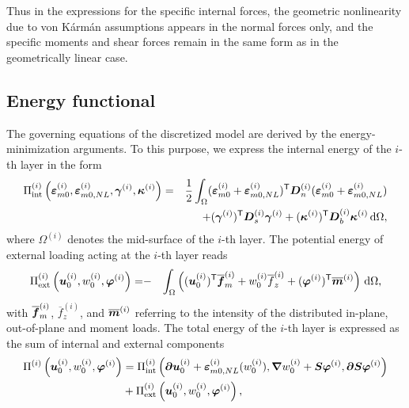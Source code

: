 \documentclass[11pt]{article}
\newcommand{\de}[1]{\,{\mathrm d}#1}
\newcommand{\curv}{\kappa} \newcommand{\curvx}{\kappa_x}
\newcommand{\rot}{\varphi}
\newcommand{\strain}{\varepsilon}
\newcommand{\sstrain}{\gamma}
\newcommand{\m}{_m}
\newcommand{\mO}{_{m0}}
\newcommand{\mONL}{_{m0,NL}}
\newcommand{\Dn}{\mtrx{D}_n}
\newcommand{\Db}{\mtrx{D}_b}
\newcommand{\Ds}{\mtrx{D}_s}
\newcommand{\layer}[1]{^{(#1)}}
\newcommand{\lay}[1]{^{(#1)}}
\newcommand{\Eint}{\Pi_{\mathrm{int}}}
\newcommand{\Eext}{\Pi_{\mathrm{ext}}}
\newcommand{\Etot}{\Pi}
\newcommand{\dmn}{\Omega}
\begin{document}
Thus in the expressions for the specific internal forces, the geometric nonlinearity due to von K\'{a}rm\'{a}n assumptions appears in the normal
forces only, and the specific moments and shear forces remain in the same form as in the geometrically linear case. 

\subsection{Energy functional}\label{sec:energy}
The governing equations of the discretized model are derived by the energy-minimization arguments. To this purpose, we express the internal energy of the $i$-th layer in the form 
\begin{eqnarray}\label{eq5:EintLEP}
\Eint\layer{i}
	\left( 
		\mtrx{\strain}\layer{i}\mO, 
		\mtrx{\strain}\layer{i}\mONL, 
		\mtrx{\sstrain}\layer{i}, 
		\mtrx{\curv}\layer{i} 
	\right)
=&&
\frac{1}{2}
\int_{\dmn}
(\mtrx{\strain}\layer{i}\mO+\mtrx{\strain}\layer{i}\mONL)\trn 
\Dn\layer{i} 
(\mtrx{\strain}\layer{i}\mO+\mtrx{\strain}\layer{i}\mONL)\\ \nonumber
&&+
(\mtrx{\sstrain}\layer{i})\trn \Ds\layer{i} \mtrx{\sstrain}\layer{i} 
+
(\mtrx{\curv}\layer{i})\trn \Db\layer{i} \mtrx{\curv}\layer{i}
\de \dmn,
\end{eqnarray}
where $\Omega\lay{i}$ denotes the mid-surface of the $i$-th layer. The potential energy of external loading acting at the $i$-th layer reads
\begin{eqnarray}
\Eext\layer{i}
\left(
	\mtrx{u}_0\layer{i},
	w_0\layer{i},
	\mtrx{\rot}\layer{i} 
\right)
= 
& - &
\int_{\dmn}
\left(
	(\mtrx{u}_0\layer{i})\trn \overline{\mtrx{f}}\m\layer{i} 
	+
	w_0\layer{i} \overline{f}_z\layer{i} 
	+
	(\mtrx{\rot}\layer{i})\trn \overline{\mtrx{m}}\layer{i} 
\right)
\de \dmn,
\label{eq4:EextLEP}
\end{eqnarray}
with $\overline{\mtrx{f}}\m\layer{i}$, $\overline{f}_z\layer{i}$, and $\overline{\mtrx{m}}\layer{i}$ referring to the intensity of the distributed
in-plane, out-of-plane and moment loads. The total energy of the $i$-th layer is expressed as the sum of internal and external components
\begin{align}
\Etot\layer{i} 
\left(
	\mtrx{u}_0\layer{i},
	w_0\layer{i},
	\mtrx{\rot}\layer{i}
\right)
& =
\Eint\layer{i}
\left(
\pard\mtrx{u}\layer{i}_0 + \mtrx{\strain}\mONL\layer{i}(w_0\layer{i}),
\mtrx{\nabla}w_0\layer{i} + \mtrx{S} \mtrx{\rot}\layer{i},
\pard\mtrx{S}\mtrx{\rot}\layer{i}
\right)
\nonumber \\
& +
\Eext\layer{i} 
\left(
	\mtrx{u}_0\layer{i},
	w_0\layer{i},
	\mtrx{\rot}\layer{i}
\right),
\end{align}
\end{document}
